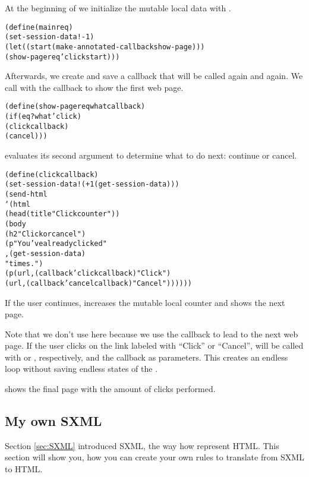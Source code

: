 At the beginning of  we initialize the mutable local data
with .

\begin{alltt}
    (define (main req)
      (set-session-data! -1)
      (let ((start (make-annotated-callback show-page)))
        (show-page req 'click start)))
\end{alltt}

Afterwards, we create and save a callback that will be called again
and again.  We call  with the callback to show the
first web page.

\begin{alltt}
    (define (show-page req what callback)
      (if (eq? what 'click)
          (click callback)
          (cancel)))
\end{alltt}

 evaluates its second argument  to
determine what to do next: continue or cancel.

\begin{alltt}
    (define (click callback)
      (set-session-data! (+ 1 (get-session-data)))
      (send-html
       `(html 
         (head (title "Click counter"))
         (body
          (h2 "Click or cancel")
          (p "You've already clicked " 
             ,(get-session-data) 
             " times.")
          (p (url ,(callback 'click callback) "Click")
             (url ,(callback 'cancel callback) "Cancel"))))))
\end{alltt}

If the user continues,  increases the mutable local
counter and shows the next page.  

Note that we don't use  here because we use
the callback to lead to the next web page.  If the user clicks on the
link labeled with ``Click'' or ``Cancel'',  will be
called with  or , respectively, and the
callback as parameters.  This creates an endless loop without saving
endless states of the \surflet.

 shows the final page with the amount of clicks
performed.  

\subsection{My own SXML}

Section \ref{sec:SXML} introduced SXML, the way how \surflets
represent HTML.   This section will show you, how you can create your
own rules to translate from SXML to HTML.

